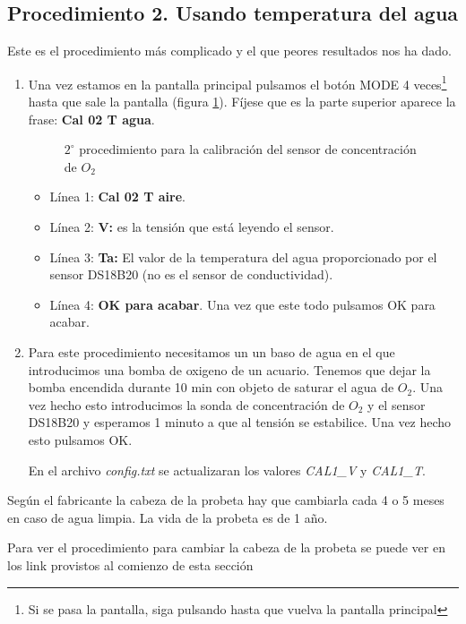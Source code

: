\subsection{Procedimiento 2. Usando temperatura del agua}
Este es el procedimiento más complicado y el que peores resultados nos ha dado.
\begin{enumerate}
\item Una vez estamos en la pantalla principal pulsamos el botón MODE 4 veces\footnote{Si se pasa la pantalla, siga pulsando hasta que vuelva la pantalla principal} hasta que sale la pantalla (figura \ref{patalla:O2agua}). Fíjese que es la parte superior aparece la frase: \textbf{Cal 02 T agua}.

\begin{figure}[htbp!] 
\caption{$2^{\circ}$ procedimiento para la calibración del sensor de concentración de $O_2$}\label{patalla:O2agua} 
\end{figure}

\begin{itemize}
\item Línea 1: \textbf{Cal 02 T aire}.
\item Línea 2: \textbf{V:} es la tensión que está leyendo el sensor.
\item Línea 3: \textbf{Ta:} El valor de la temperatura del agua proporcionado por el sensor DS18B20 (no es el sensor de conductividad).
\item Línea 4: \textbf{OK para acabar}. Una vez que este todo pulsamos OK para acabar.
\end{itemize}

\item Para este procedimiento necesitamos un un baso de agua en el que introducimos una bomba de oxigeno de un acuario. Tenemos que dejar la bomba encendida durante 10 min con objeto de saturar el agua de $O_2$. Una vez hecho esto introducimos la sonda de concentración de $O_2$ y el sensor DS18B20 y esperamos 1 minuto a que al tensión se estabilice. Una vez hecho esto pulsamos OK.

En el archivo \emph{config.txt} se actualizaran los valores \emph{CAL1\_V} y \emph{CAL1\_T}.
\end{enumerate}


\begin{tcolorbox}
[colback=red!5!white,colframe=red!75!black,fonttitle=\bfseries,title=VIDA DEL SENSOR $O_2$]

Según el fabricante la cabeza de la probeta hay que cambiarla cada 4 o 5 meses en caso de agua limpia. La vida de la probeta es de 1 año.

Para ver el procedimiento para cambiar la cabeza de la probeta se puede ver en los link provistos al comienzo de esta sección

\end{tcolorbox}

